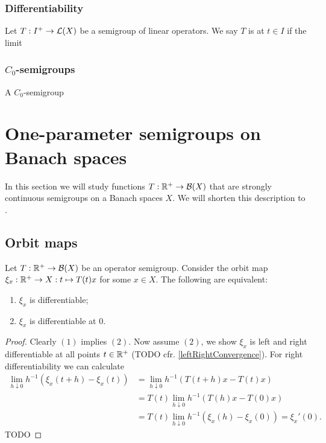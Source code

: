 \begin{definition}

\end{definition}

\subsection{Differentiability}
\begin{definition}
Let $T: I^+ \to \operatorname{\mathcal{L}}(X)$ be a semigroup of linear operators. We say $T$ is  at $t\in I$ if the limit
\[  \]
\end{definition}

\subsection{$C_0$-semigroups}
\begin{definition}
A $C_0$-semigroup
\end{definition}

\chapter{One-parameter semigroups on Banach spaces}
In this section we will study functions $T: \mathbb{R}^+\to \operatorname{\mathcal{B}}(X)$ that are strongly continuous semigroups on a Banach spaces $X$. We will shorten this description to .

\section{Orbit maps}
\begin{lemma}
Let $T: \mathbb{R}^+\to \operatorname{\mathcal{B}}(X)$ be an operator semigroup. Consider the orbit map $\xi_x: \mathbb{R}^+ \to X: t\mapsto T(t)x$ for some $x\in X$. The following are equivalent:
\begin{enumerate}
\item $\xi_x$ is differentiable;
\item $\xi_x$ is differentiable at $0$.
\end{enumerate}
\end{lemma}
\begin{proof}
Clearly $(1)$ implies $(2)$. Now assume $(2)$, we show $\xi_x$ is left and right differentiable at all points $t\in\mathbb{R}^+$ (TODO cfr. \ref{leftRightConvergence}). For right differentiability we can calculate
\begin{align*}
\lim_{h\downarrow 0} h^{-1}(\xi_x(t+h) - \xi_x(t)) &= \lim_{h\downarrow 0} h^{-1}(T(t+h)x - T(t)x) \\
&= T(t)\lim_{h\downarrow 0} h^{-1}(T(h)x - T(0)x) \\
&= T(t)\lim_{h\downarrow 0} h^{-1}(\xi_x(h) - \xi_x(0)) = \xi_x'(0).
\end{align*}
TODO
\end{proof}

